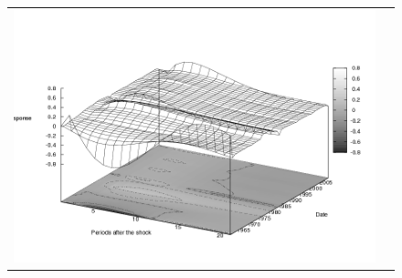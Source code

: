 \begin{figure}
\begin{tabular}{cc}
\includegraphics[scale=0.25]{results_wlsinit/Inflation_mpshock_irf3d.png} \\ 
\end{tabular}
\end{figure}
